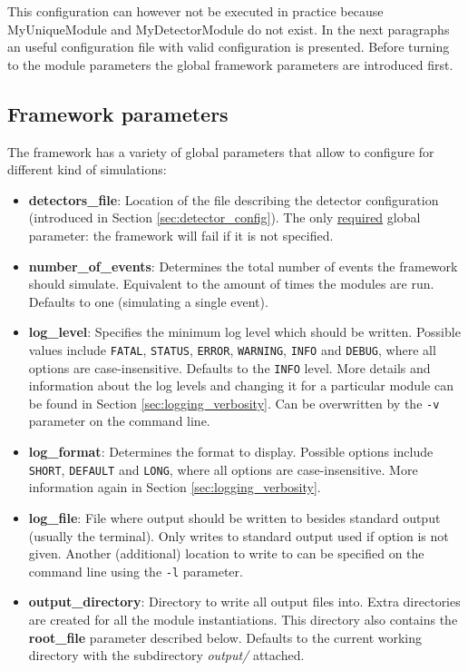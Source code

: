 This configuration can however not be executed in practice because MyUniqueModule and MyDetectorModule do not exist. In the next paragraphs an useful configuration file with valid configuration is presented. Before turning to the module parameters the global framework parameters are introduced first.

\subsection{Framework parameters}
\label{sec:framework_parameters}
The framework has a variety of global parameters that allow to configure \apsq for different kind of simulations:
\begin{itemize}
\item \textbf{detectors\_file}: Location of the file describing the detector configuration (introduced in Section \ref{sec:detector_config}). The only \underline{required} global parameter: the framework will fail if it is not specified.
\item \textbf{number\_of\_events}: Determines the total number of events the framework should simulate. Equivalent to the amount of times the modules are run. Defaults to one (simulating a single event).
\item \textbf{log\_level}: Specifies the minimum log level which should be written. Possible values include \texttt{FATAL}, \texttt{STATUS}, \texttt{ERROR}, \texttt{WARNING}, \texttt{INFO} and \texttt{DEBUG}, where all options are case-insensitive. Defaults to the \texttt{INFO} level. More details and information about the log levels and changing it for a particular module can be found in Section \ref{sec:logging_verbosity}. Can be overwritten by the \texttt{-v} parameter on the command line.
\item \textbf{log\_format}: Determines the format to display. Possible options include \texttt{SHORT}, \texttt{DEFAULT} and \texttt{LONG}, where all options are case-insensitive. More information again in Section \ref{sec:logging_verbosity}.
\item \textbf{log\_file}: File where output should be written to besides standard output (usually the terminal). Only writes to standard output used if option is not given. Another (additional) location to write to can be specified on the command line using the \texttt{-l} parameter.
\item \textbf{output\_directory}: Directory to write all output files into. Extra directories are created for all the module instantiations. This directory also contains the \textbf{root\_file} parameter described below. Defaults to the current working directory with the subdirectory \textit{output/} attached.

\end{itemize}
